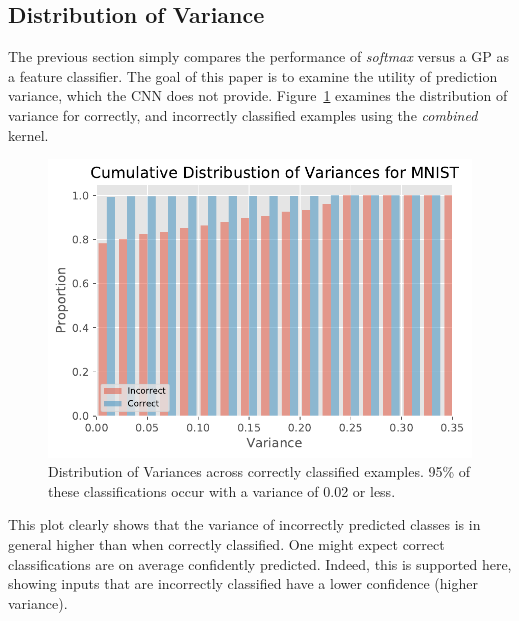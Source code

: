 \documentclass{article}
\begin{document}


\subsection{Distribution of Variance}

The previous section simply compares the performance of \textit{softmax} versus a GP as a feature classifier. The goal of this paper is to examine the utility of prediction variance, which the CNN does not provide. Figure~\ref{fig:mnist-variances} examines the distribution of variance for correctly, and incorrectly classified examples using the \textit{combined} kernel.


\begin{figure}[hbt]
\centering
\includegraphics[width=\hsize]{figures/mnist/variances_combined.pdf}
\caption{Distribution of Variances across correctly classified examples. 95\% of these classifications occur with a variance of 0.02 or less.}
\label{fig:mnist-variances}
\end{figure}


This plot clearly shows that the variance of incorrectly predicted classes is in general higher than when correctly classified. One might expect correct classifications are on average confidently predicted. Indeed, this is supported here, showing inputs that are incorrectly classified have a lower confidence (higher variance). 
\end{document}
